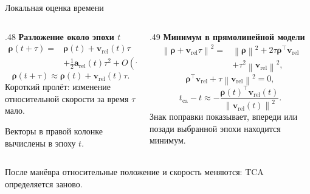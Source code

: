 \documentclass[11pt,aspectratio=169,t]{beamer}
\newcommand{\eqcompact}{\fontsize{10}{12}\selectfont}
\newcommand{\derivationmathspacing}{%
  \setlength{\abovedisplayskip}{2pt}%
  \setlength{\belowdisplayskip}{3pt}%
  \setlength{\abovedisplayshortskip}{2pt}%
  \setlength{\belowdisplayshortskip}{2pt}%
  \setlength{\jot}{2pt}}
\newcommand{\vect}[1]{\boldsymbol{#1}}
\newcommand{\norm}[1]{\left\lVert#1\right\rVert}
\begin{document}
\begin{frame}{Локальная оценка времени}
\relax\derivationmathspacing
\begin{columns}[T,onlytextwidth]
\begin{column}{.48\textwidth}
\textbf{Разложение около эпохи $t$}
{\eqcompact\derivationmathspacing
\[
\begin{aligned}
\vect\rho(t+\tau)={}&\vect\rho(t)+\vect v_{\mathrm{rel}}(t)\tau\\
&+\tfrac12\vect a_{\mathrm{rel}}(t)\tau^2+O(\tau^3).
\end{aligned}
\]
\[
\vect\rho(t+\tau)\approx\vect\rho(t)+\vect v_{\mathrm{rel}}(t)\tau.
\]
}
Короткий пролёт: изменение относительной скорости за время $\tau$ мало.
\par\smallskip
Векторы в правой колонке вычислены в эпоху $t$.
\end{column}
\begin{column}{.49\textwidth}
\textbf{Минимум в прямолинейной модели}
{\eqcompact\derivationmathspacing
\[
\begin{aligned}
\norm{\vect\rho+\vect v_{\mathrm{rel}}\tau}^2
={}&\norm{\vect\rho}^2+2\tau\vect\rho^\top\vect v_{\mathrm{rel}}\\
&+\tau^2\norm{\vect v_{\mathrm{rel}}}^2,
\end{aligned}
\]
\[
\vect\rho^\top\vect v_{\mathrm{rel}}
 +\tau\norm{\vect v_{\mathrm{rel}}}^2=0,
\]
\[
\boxed{t_{\mathrm{ca}}-t\approx
-\frac{\vect\rho(t)^\top\vect v_{\mathrm{rel}}(t)}
 {\norm{\vect v_{\mathrm{rel}}(t)}^2}.}
\]
}
Знак поправки показывает, впереди или позади выбранной эпохи находится минимум.
\end{column}
\end{columns}
\smallskip
После манёвра относительные положение и скорость меняются: TCA определяется заново.
\end{frame}
\end{document}
